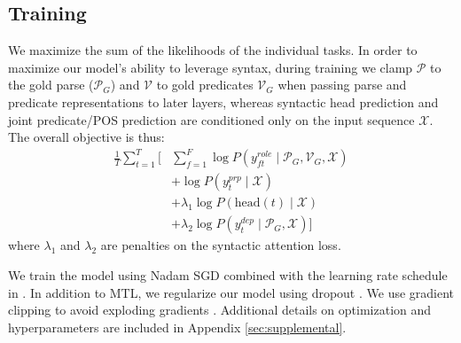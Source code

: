 \documentclass[11pt,a4paper]{article}
\begin{document}
\subsection{Training \label{sec:train-opt}}
We maximize the sum of the likelihoods of the individual tasks.
In order to maximize our model's ability to leverage syntax, during training we clamp $\mathcal{P}$ to the gold parse ($\mathcal{P}_G$) and $\mathcal{V}$ to gold predicates $\mathcal{V}_G$ when passing parse and predicate representations to later layers, whereas syntactic head prediction and joint predicate/POS prediction are conditioned only on the input sequence $\mathcal{X}$. The overall objective is thus:
\begin{align}
\frac{1}{T}\sum_{t=1}^T\Big[&\sum_{f=1}^F \log P(y_{ft}^{role}\mid \mathcal{P}_G, \mathcal{V}_G, \mathcal{X}) \nonumber \\ %
&+ \log P(y_t^{prp}\mid \mathcal{X}) \nonumber \\ %
&+ \lambda_1 \log P(\mathrm{head}(t)\mid \mathcal{X}) \nonumber \\ %
&+ \lambda_2 \log P(y_t^{dep} \mid \mathcal{P}_G, \mathcal{X}) \label{eqn:rel-term} \Big]
\end{align}
where $\lambda_1$ and $\lambda_2$ are penalties on the syntactic attention loss. 

We train the model using Nadam \citep{dozat2016incorporating} SGD combined with the learning rate schedule in \citet{vaswani2017attention}. In addition to MTL, we regularize our model using dropout \citep{srivastava2014dropout}. We use gradient clipping to avoid exploding gradients \citep{bengio1994learning, pascanu2013on}. Additional details on optimization and hyperparameters are included in Appendix \ref{sec:supplemental}.
\end{document}
